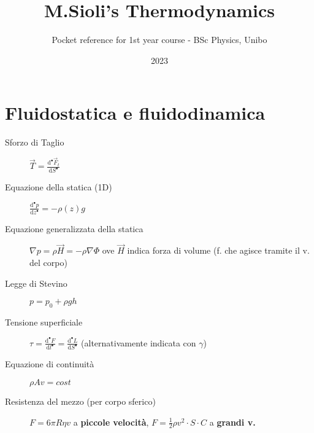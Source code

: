 \documentclass[10pt, oneside]{article}
\title{M.Sioli's Thermodynamics}
\author{Pocket reference for 1st year course - BSc Physics, Unibo}
\date{2023}
\begin{document}
\maketitle

\tableofcontents

\section{Fluidostatica e fluidodinamica}
\begin{description}
\item[Sforzo di Taglio] $\displaystyle \vec{T} = \frac{\mathrm{d}^{•} \vec{F}_t}{\mathrm{d}S^{•}}$
\item[Equazione della statica (1D)] $\displaystyle \frac{\mathrm{d}^{•} p}{\mathrm{d}z^{•}} = - \rho (z) g$
\item[Equazione generalizzata della statica] $\displaystyle \nabla p = \rho \vec{H} = - \rho \nabla \Phi$ ove $\vec{H}$ indica forza di volume (f. che agisce tramite il v. del corpo)
\item[Legge di Stevino] $p = p_0 + \rho g h$
\item[Tensione superficiale] $\displaystyle \tau = \frac{\mathrm{d}^{•} F}{\mathrm{d}l^{•}} = \frac{\mathrm{d}^{•} L}{\mathrm{d}S^{•}}$ (alternativamente indicata con $\gamma$)
\item[Equazione di continuità] $\rho A v = cost$
\item[Resistenza del mezzo (per corpo sferico)] $\displaystyle F = 6 \pi R \eta v$ a \textbf{piccole velocità}, $\displaystyle F = \frac{1}{2} \rho v^2 \cdot S \cdot C$ a \textbf{grandi v.}
\end{description}
\end{document}
